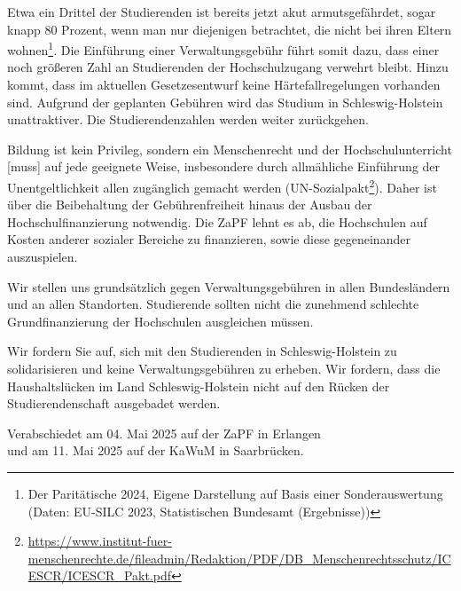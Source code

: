 \documentclass[DIV=calc]{scrartcl}
\let\oldgrqq=\grqq
\def\grqq{\oldgrqq\xspace}
\begin{document}
Etwa ein Drittel der Studierenden ist bereits jetzt akut armutsgefährdet, sogar knapp 80 Prozent, wenn man nur diejenigen betrachtet, die nicht bei ihren Eltern wohnen\footnote{Der Paritätische 2024, Eigene Darstellung auf Basis einer Sonderauswertung (Daten: EU-SILC 2023, Statistischen Bundesamt (Ergebnisse))}. Die Einführung einer Verwaltungsgebühr führt somit dazu, dass einer noch größeren Zahl an Studierenden der Hochschulzugang verwehrt bleibt. Hinzu kommt, dass im aktuellen Gesetzesentwurf keine Härtefallregelungen vorhanden sind. Aufgrund der geplanten Gebühren wird das Studium in Schleswig-Holstein unattraktiver. Die Studierendenzahlen werden weiter zurückgehen.

Bildung ist kein Privileg, sondern ein Menschenrecht und \glqq der Hochschulunterricht [muss] auf jede
geeignete Weise, insbesondere durch allmähliche Einführung der Unentgeltlichkeit\grqq{} allen zugänglich
gemacht werden (UN-Sozialpakt\footnote{\url{https://www.institut-fuer-menschenrechte.de/fileadmin/Redaktion/PDF/DB_Menschenrechtsschutz/ICESCR/ICESCR_Pakt.pdf}}). Daher ist über die Beibehaltung der Gebührenfreiheit hinaus der Ausbau der Hochschulfinanzierung notwendig. Die ZaPF lehnt es ab, die Hochschulen auf Kosten anderer sozialer Bereiche zu finanzieren, sowie diese gegeneinander auszuspielen.

Wir stellen uns grundsätzlich gegen Verwaltungsgebühren in allen Bundesländern und an allen Standorten. Studierende sollten nicht die zunehmend schlechte Grundfinanzierung der Hochschulen ausgleichen müssen.

Wir fordern Sie auf, sich mit den Studierenden in Schleswig-Holstein zu solidarisieren und keine Verwaltungsgebühren zu erheben. Wir fordern, dass die Haushaltslücken im Land Schleswig-Holstein nicht auf den Rücken der Studierendenschaft ausgebadet werden.




%
\vfill
\begin{flushright}
	Verabschiedet am 04. Mai 2025 
	auf der ZaPF in Erlangen \\
	und am 11. Mai 2025
	auf der KaWuM in Saarbrücken.
\end{flushright}
\end{document}
